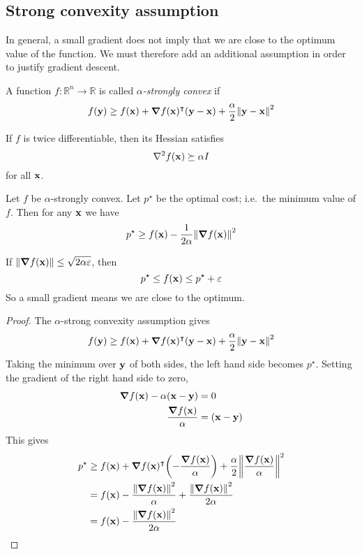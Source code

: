 \subsection{Strong convexity assumption}
In general, a small gradient does not imply that we are close to the optimum value of the function.
We must therefore add an additional assumption in order to justify gradient descent.
\begin{definition}
	A function \(f \colon \mathbb R^n \to \mathbb R\) is called \textit{\(\alpha\)-strongly convex} if
	\[
		f(\vb y) \geq f(\vb x) + \grad{f(\vb x)}^\intercal (\vb y - \vb x) + \frac{\alpha}{2}\norm{\vb y - \vb x}^2
	\]
\end{definition}
\noindent If \(f\) is twice differentiable, then its Hessian satisfies
\[
	\laplacian{f(\vb x)} \succeq \alpha I
\]
for all \(\vb x\).
\begin{claim}
	Let \(f\) be \(\alpha\)-strongly convex.
	Let \(p^\star\) be the optimal cost; i.e.\ the minimum value of \(f\).
	Then for any \(\vb x\) we have
	\[
		p^\star \geq f(\vb x) - \frac{1}{2\alpha}\norm{\grad{f(\vb x)}}^2
	\]
\end{claim}
\begin{remark}
	If \(\norm{\grad{f(\vb x)}} \leq \sqrt{2\alpha\varepsilon}\), then
	\[
		p^\star \leq f(\vb x) \leq p^\star + \varepsilon
	\]
	So a small gradient means we are close to the optimum.
\end{remark}
\begin{proof}
	The \(\alpha\)-strong convexity assumption gives
	\[
		f(\vb y) \geq f(\vb x) + \grad{f(\vb x)}^\intercal (\vb y - \vb x) + \frac{\alpha}{2}\norm{\vb y - \vb x}^2
	\]
	Taking the minimum over \(\vb y\) of both sides, the left hand side becomes \(p^\star\).
	Setting the gradient of the right hand side to zero,
	\begin{align*}
		\grad{f(\vb x)} - \alpha (\vb x - \vb y) & = 0               \\
		\frac{\grad{f(\vb x)}}{\alpha}           & = (\vb x - \vb y) \\
	\end{align*}
	This gives
	\begin{align*}
		p^\star & \geq f(\vb x) + \grad{f(\vb x)}^\intercal \qty(-\frac{\grad{f(\vb x)}}{\alpha}) + \frac{\alpha}{2}\norm{\frac{\grad{f(\vb x)}}{\alpha}}^2 \\
		        & = f(\vb x) - \frac{\norm{\grad{f(\vb x)}}^2}{\alpha} + \frac{\norm{\grad{f(\vb x)}}^2}{2\alpha}                                            \\
		        & = f(\vb x) - \frac{\norm{\grad{f(\vb x)}}^2}{2\alpha}
	\end{align*}
\end{proof}
